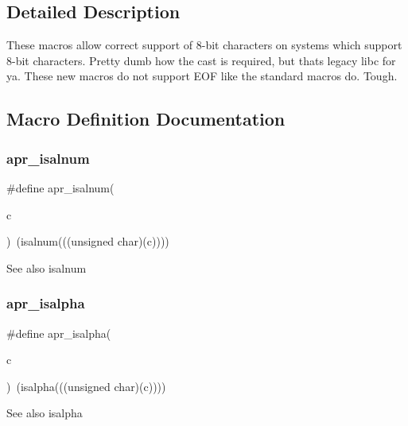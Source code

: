 \subsection{Detailed Description}
These macros allow correct support of 8-\/bit characters on systems which support 8-\/bit characters. Pretty dumb how the cast is required, but that\textquotesingle{}s legacy libc for ya. These new macros do not support E\+OF like the standard macros do. Tough. 

\subsection{Macro Definition Documentation}
\mbox{\label{group__apr__ctype_ga4fa78e6e7272dae64731768a17a2e003}} 
\subsubsection{\texorpdfstring{apr\+\_\+isalnum}{apr\_isalnum}}
{\footnotesize\ttfamily \#define apr\+\_\+isalnum(\begin{DoxyParamCaption}\item[{}]{c }\end{DoxyParamCaption})~(isalnum(((unsigned char)(c))))}

\begin{DoxySeeAlso}{See also}
isalnum 
\end{DoxySeeAlso}
\mbox{\label{group__apr__ctype_ga9ecd5b94a7816591afd68040b0624327}} 
\subsubsection{\texorpdfstring{apr\+\_\+isalpha}{apr\_isalpha}}
{\footnotesize\ttfamily \#define apr\+\_\+isalpha(\begin{DoxyParamCaption}\item[{}]{c }\end{DoxyParamCaption})~(isalpha(((unsigned char)(c))))}

\begin{DoxySeeAlso}{See also}
isalpha 
\end{DoxySeeAlso}
\mbox{\label{group__apr__ctype_gae7cab1b39d2e0fc14f343ec14e12565a}} 
